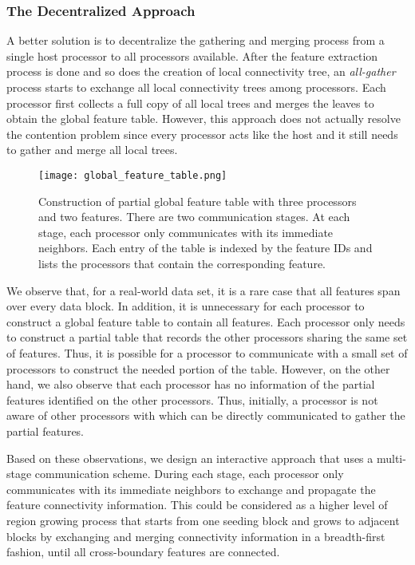 \subsubsection{The Decentralized Approach}
\label{sec:decentralized}

A better solution is to decentralize the gathering and merging process from a single host processor to all processors available. After the feature extraction process is done and so does the creation of local connectivity tree, an \emph{all-gather} process starts to exchange all local connectivity trees among processors. Each processor first collects a full copy of all local trees and merges the leaves to obtain the global feature table. However, this approach does not actually resolve the contention problem since every processor acts like the host and it still needs to gather and merge all local trees.

\begin{figure}[t]
	\centering
	\texttt{[image: global\_feature\_table.png]}
	\caption{Construction of partial global feature table with three processors and two features. There are two communication stages. At each stage, each processor only communicates with its immediate neighbors. Each entry of the table is indexed by the feature IDs and lists the processors that contain the corresponding feature.}
	\label{fig:global_table}
\end{figure}

We observe that, for a real-world data set, it is a rare case that all features span over every data block. In addition, it is unnecessary for each processor to construct a global feature table to contain all features. Each processor only needs to construct a partial table that records the other processors sharing the same set of features. Thus, it is possible for a processor to communicate with a small set of processors to construct the needed portion of the table. However, on the other hand, we also observe that each processor has no information of the partial features identified on the other processors. Thus, initially, a processor is not aware of other processors with which can be directly communicated to gather the partial features.

Based on these observations, we design an interactive approach that uses a multi-stage communication scheme. During each stage, each processor only communicates with its immediate neighbors to exchange and propagate the feature connectivity information. This could be considered as a higher level of region growing process that starts from one seeding block and grows to adjacent blocks by exchanging and merging connectivity information in a breadth-first fashion, until all cross-boundary features are connected.

